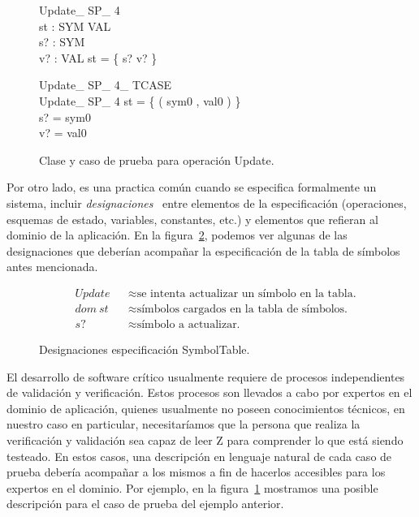 \begin{figure}[H]
  \centering
  \begin{schema}{Update\_ SP\_ 4}\\
   st : SYM \pfun VAL \\
   s? : SYM \\
   v? : VAL 
  \where
   \dom st = \dom \{ s? \mapsto v? \}
  \end{schema}
  
  \begin{schema}{Update\_ SP\_ 4\_ TCASE}\\
   Update\_ SP\_ 4 
  \where
   st = \{ ( sym0 , val0 ) \} \\
   s? = sym0 \\
   v? = val0
 \end{schema}
 \caption{Clase y caso de prueba para operación Update.}
 \label{fig:intro_tcl}
\end{figure}

Por otro lado, es una practica común cuando se especifica formalmente un sistema, incluir \emph{designaciones}~\cite{jackson} entre elementos de la especificación (operaciones, esquemas de estado, variables, constantes, etc.) y elementos que refieran al dominio de la aplicación. En la figura~\ref{fig:intro_desig}, podemos ver algunas de las designaciones que deberían acompañar la especificación de la tabla de símbolos antes mencionada.

\begin{figure}[H]
  \begin{align*} 
    &Update && \approx \text{se intenta actualizar un símbolo en la tabla.} \\
    &dom~st && \approx \text{símbolos cargados en la tabla de símbolos.} \\
    &s? && \approx \text{símbolo a actualizar.} 
  \end{align*}
 \caption{Designaciones especificación SymbolTable.}
 \label{fig:intro_desig}
\end{figure}


El desarrollo de software crítico usualmente requiere de procesos independientes de validación y verificación. Estos procesos son llevados a cabo por expertos en el dominio de aplicación, quienes usualmente no poseen conocimientos técnicos, en nuestro caso en particular, necesitaríamos que la persona que realiza la verificación y validación sea capaz de leer Z para comprender lo que está siendo testeado. En estos casos, una descripción en lenguaje natural de cada caso de prueba debería acompañar a los mismos a fin de hacerlos accesibles para los expertos en el dominio. Por ejemplo, en la figura~\ref{fig:intro_tcl} mostramos una posible descripción para el caso de prueba del ejemplo anterior. 

